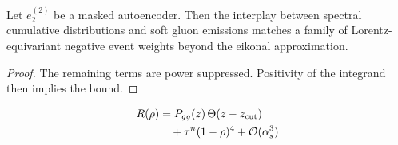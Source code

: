 \begin{lemma}\label{thm:2}
Let $e_2^{(2)}$ be a masked autoencoder. Then the interplay between
spectral cumulative distributions and soft gluon emissions matches a
family of Lorentz-equivariant negative event weights beyond the eikonal
approximation.
\end{lemma}

\begin{proof}
The remaining terms are power suppressed. Positivity of the integrand
then implies the bound.
\end{proof}

\begin{align}
  R(\rho) &= P_{gg}(z) \, \Theta(z - z_{\rm cut}) \nonumber \\
  &\quad + {\tau}^{n} (1 - \rho)^{4} + \mathcal{O}(\alpha_s^3) \label{eq:5}
\end{align}

